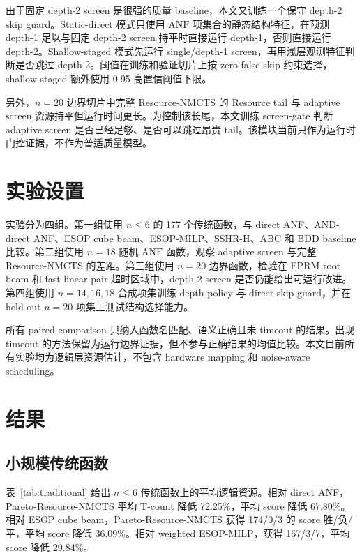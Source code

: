 \documentclass[UTF8,fontset=macnew,11pt]{ctexart}
\newcommand{\method}{Resource-NMCTS}
\newcommand{\pareto}{Pareto-Resource-NMCTS}
\newcommand{\anf}{\ensuremath{\mathrm{ANF}}}
\begin{document}
由于固定 depth-2 screen 是很强的质量 baseline，本文又训练一个保守 depth-2 skip guard。Static-direct 模式只使用 \anf{} 项集合的静态结构特征，在预测 depth-1 足以与固定 depth-2 screen 持平时直接运行 depth-1，否则直接运行 depth-2。Shallow-staged 模式先运行 single/depth-1 screen，再用浅层观测特征判断是否跳过 depth-2。阈值在训练和验证切片上按 zero-false-skip 约束选择，shallow-staged 额外使用 0.95 高置信阈值下限。

另外，$n=20$ 边界切片中完整 \method{} 的 Resource tail 与 adaptive screen 资源持平但运行时间更长。为控制该长尾，本文训练 screen-gate 判断 adaptive screen 是否已经足够、是否可以跳过昂贵 tail。该模块当前只作为运行时门控证据，不作为普适质量模型。

\section{实验设置}

实验分为四组。第一组使用 $n\leq6$ 的 177 个传统函数，与 direct ANF、AND-direct ANF、ESOP cube beam、ESOP-MILP、SSHR-H、ABC 和 BDD baseline 比较。第二组使用 $n=18$ 随机 \anf{} 函数，观察 adaptive screen 与完整 \method{} 的差距。第三组使用 $n=20$ 边界函数，检验在 FPRM root beam 和 fast linear-pair 超时区域中，depth-2 screen 是否仍能给出可运行改进。第四组使用 $n=14,16,18$ 合成项集训练 depth policy 与 direct skip guard，并在 held-out $n=20$ 项集上测试结构选择能力。

所有 paired comparison 只纳入函数名匹配、语义正确且未 timeout 的结果。出现 timeout 的方法保留为运行边界证据，但不参与正确结果的均值比较。本文目前所有实验均为逻辑层资源估计，不包含 hardware mapping 和 noise-aware scheduling。

\section{结果}

\subsection{小规模传统函数}

表~\ref{tab:traditional} 给出 $n\leq6$ 传统函数上的平均逻辑资源。相对 direct ANF，\pareto{} 平均 T-count 降低 72.25\%，平均 score 降低 67.80\%。相对 ESOP cube beam，\pareto{} 获得 174/0/3 的 score 胜/负/平，平均 score 降低 36.09\%。相对 weighted ESOP-MILP，获得 167/3/7，平均 score 降低 29.84\%。
\end{document}
